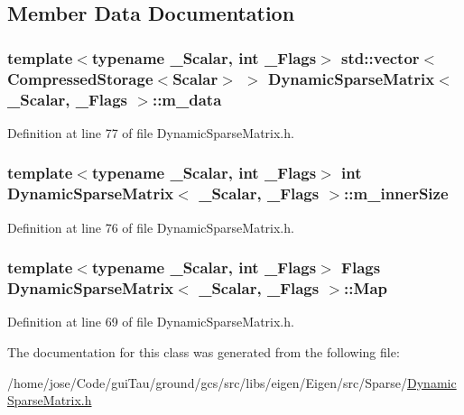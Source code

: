 \subsection{Member Data Documentation}
\hypertarget{class_dynamic_sparse_matrix_a9655a5f37dc37d24df30b047b346529f}{
\subsubsection[{m\-\_\-data}]{\setlength{\rightskip}{0pt plus 5cm}template$<$typename \-\_\-\-Scalar, int \-\_\-\-Flags$>$ std\-::vector$<${\bf Compressed\-Storage}$<${\bf Scalar}$>$ $>$ {\bf Dynamic\-Sparse\-Matrix}$<$ \-\_\-\-Scalar, \-\_\-\-Flags $>$\-::m\-\_\-data\hspace{0.3cm}{\ttfamily [protected]}}}\label{class_dynamic_sparse_matrix_a9655a5f37dc37d24df30b047b346529f}


Definition at line 77 of file Dynamic\-Sparse\-Matrix.\-h.

\hypertarget{class_dynamic_sparse_matrix_a647dcdae35dc9c1ff0d0cc0ae1194373}{
\subsubsection[{m\-\_\-inner\-Size}]{\setlength{\rightskip}{0pt plus 5cm}template$<$typename \-\_\-\-Scalar, int \-\_\-\-Flags$>$ {\bf int} {\bf Dynamic\-Sparse\-Matrix}$<$ \-\_\-\-Scalar, \-\_\-\-Flags $>$\-::m\-\_\-inner\-Size\hspace{0.3cm}{\ttfamily [protected]}}}\label{class_dynamic_sparse_matrix_a647dcdae35dc9c1ff0d0cc0ae1194373}


Definition at line 76 of file Dynamic\-Sparse\-Matrix.\-h.

\hypertarget{class_dynamic_sparse_matrix_a3d8ab26ff318f25e40796717685f7a62}{
\subsubsection[{Map}]{\setlength{\rightskip}{0pt plus 5cm}template$<$typename \-\_\-\-Scalar, int \-\_\-\-Flags$>$ {\bf Flags} {\bf Dynamic\-Sparse\-Matrix}$<$ \-\_\-\-Scalar, \-\_\-\-Flags $>$\-::{\bf Map}}}\label{class_dynamic_sparse_matrix_a3d8ab26ff318f25e40796717685f7a62}


Definition at line 69 of file Dynamic\-Sparse\-Matrix.\-h.



The documentation for this class was generated from the following file\-:\begin{DoxyCompactItemize}
\item 
/home/jose/\-Code/gui\-Tau/ground/gcs/src/libs/eigen/\-Eigen/src/\-Sparse/\hyperlink{_dynamic_sparse_matrix_8h}{Dynamic\-Sparse\-Matrix.\-h}\end{DoxyCompactItemize}

